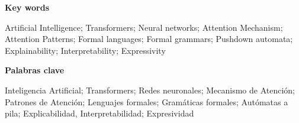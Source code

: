 {\huge\bfseries \space Key words}
\bigskip

Artificial Intelligence; Transformers; Neural networks; Attention Mechanism; Attention Patterns; Formal languages; Formal grammars; Pushdown automata; Explainability; Interpretability; Expressivity

\bigskip
\bigskip
\bigskip
\bigskip
{\huge\bfseries \space Palabras clave}
\bigskip

Inteligencia Artificial; Transformers; Redes neuronales; Mecanismo de Atención; Patrones de Atención; Lenguajes formales; Gramáticas formales; Autómatas a pila; Explicabilidad, Interpretabilidad; Expresividad
